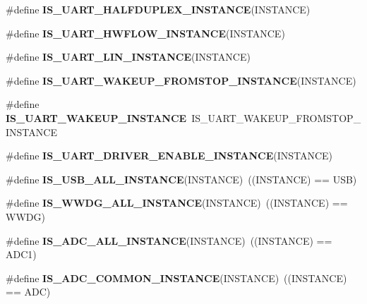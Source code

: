 \begin{DoxyCompactItemize}
\#define {\bfseries I\+S\+\_\+\+U\+A\+R\+T\+\_\+\+H\+A\+L\+F\+D\+U\+P\+L\+E\+X\+\_\+\+I\+N\+S\+T\+A\+N\+CE}(I\+N\+S\+T\+A\+N\+CE)
\item 
\#define {\bfseries I\+S\+\_\+\+U\+A\+R\+T\+\_\+\+H\+W\+F\+L\+O\+W\+\_\+\+I\+N\+S\+T\+A\+N\+CE}(I\+N\+S\+T\+A\+N\+CE)
\item 
\#define {\bfseries I\+S\+\_\+\+U\+A\+R\+T\+\_\+\+L\+I\+N\+\_\+\+I\+N\+S\+T\+A\+N\+CE}(I\+N\+S\+T\+A\+N\+CE)
\item 
\#define {\bfseries I\+S\+\_\+\+U\+A\+R\+T\+\_\+\+W\+A\+K\+E\+U\+P\+\_\+\+F\+R\+O\+M\+S\+T\+O\+P\+\_\+\+I\+N\+S\+T\+A\+N\+CE}(I\+N\+S\+T\+A\+N\+CE)
\item 
\mbox{\label{group___exported__macro_ga69e32d838272d886316fcfa378605ed0}} 
\#define {\bfseries I\+S\+\_\+\+U\+A\+R\+T\+\_\+\+W\+A\+K\+E\+U\+P\+\_\+\+I\+N\+S\+T\+A\+N\+CE}~I\+S\+\_\+\+U\+A\+R\+T\+\_\+\+W\+A\+K\+E\+U\+P\+\_\+\+F\+R\+O\+M\+S\+T\+O\+P\+\_\+\+I\+N\+S\+T\+A\+N\+CE
\item 
\#define {\bfseries I\+S\+\_\+\+U\+A\+R\+T\+\_\+\+D\+R\+I\+V\+E\+R\+\_\+\+E\+N\+A\+B\+L\+E\+\_\+\+I\+N\+S\+T\+A\+N\+CE}(I\+N\+S\+T\+A\+N\+CE)
\item 
\mbox{\label{group___exported__macro_ga763f287042e73e61b91e12bb065777cd}} 
\#define {\bfseries I\+S\+\_\+\+U\+S\+B\+\_\+\+A\+L\+L\+\_\+\+I\+N\+S\+T\+A\+N\+CE}(I\+N\+S\+T\+A\+N\+CE)~((I\+N\+S\+T\+A\+N\+CE) == U\+SB)
\item 
\mbox{\label{group___exported__macro_gac2a8aaec233e19987232455643a04d6f}} 
\#define {\bfseries I\+S\+\_\+\+W\+W\+D\+G\+\_\+\+A\+L\+L\+\_\+\+I\+N\+S\+T\+A\+N\+CE}(I\+N\+S\+T\+A\+N\+CE)~((I\+N\+S\+T\+A\+N\+CE) == W\+W\+DG)
\item 
\mbox{\label{group___exported__macro_ga2204b62b378bcf08b3b9006c184c7c23}} 
\#define {\bfseries I\+S\+\_\+\+A\+D\+C\+\_\+\+A\+L\+L\+\_\+\+I\+N\+S\+T\+A\+N\+CE}(I\+N\+S\+T\+A\+N\+CE)~((I\+N\+S\+T\+A\+N\+CE) == A\+D\+C1)
\item 
\mbox{\label{group___exported__macro_gad8a5831c786b6b265531b890a194cbe2}} 
\#define {\bfseries I\+S\+\_\+\+A\+D\+C\+\_\+\+C\+O\+M\+M\+O\+N\+\_\+\+I\+N\+S\+T\+A\+N\+CE}(I\+N\+S\+T\+A\+N\+CE)~((I\+N\+S\+T\+A\+N\+CE) == A\+DC)
\item 

\end{DoxyCompactItemize}
